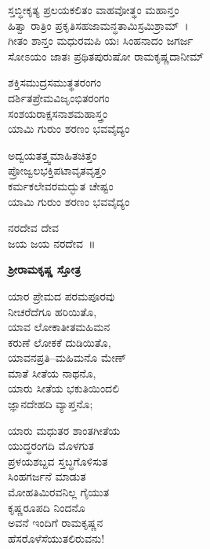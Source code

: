 
\begin{myquote}
ಸ್ತಬ್ಧೀಕೃತ್ಯ ಪ್ರಲಯಕಲಿತಂ ವಾಹವೋತ್ಥಂ ಮಹಾನ್ತಂ\\ಹಿತ್ವಾ ರಾತ್ರಿಂ ಪ್ರಕೃತಿಸಹಜಾಮನ್ಧತಾಮಿಸ್ರಮಿಶ್ರಾಮ್~।\\
ಗೀತಂ ಶಾನ್ತಂ ಮಧುರಮಪಿ ಯಃ ಸಿಂಹನಾದಂ ಜಗರ್ಜ\\ಸೋಽಯಂ ಜಾತಃ ಪ್ರಥಿತಪುರುಷೋ ರಾಮಕೃಷ್ಣದಾನೀಮ್
\end{myquote}


\begin{myquote}
ಶಕ್ತಿಸಮುದ್ರಸಮುತ್ಥತರಂಗಂ\\ದರ್ಶಿತಪ್ರೇಮವಿಜೃಂಭಿತರಂಗಂ\\ಸಂಶಯರಾಕ್ಷಸನಾಶಮಹಾಸ್ತ್ರಂ\\ಯಾಮಿ ಗುರುಂ ಶರಣಂ ಭವವೈದ್ಯಂ
\end{myquote}


\begin{myquote}
ಅದ್ವಯತತ್ತ್ವಮಾಹಿತಚಿತ್ತಂ\\ಪ್ರೋಜ್ವಲಭಕ್ತಿಪಟಾವೃತವೃತ್ತಂ\\ಕರ್ಮಕಲೇವರಮದ್ಭುತ ಚೇಷ್ಟಂ\\ಯಾಮಿ ಗುರುಂ ಶರಣಂ ಭವವೈದ್ಯಂ
\end{myquote}


\begin{myquote}
ನರದೇವ ದೇವ\\ಜಯ ಜಯ ನರದೇವ~॥
\end{myquote}

\begin{center}
\textbf{ಶ‍್ರೀರಾಮಕೃಷ್ಣ ಸ್ತೋತ್ರ}
\end{center}

\begin{myquote}
ಯಾರ ಪ್ರೇಮದ ಪರಮಪೂರವು\\ನೀಚರೆದೆಗೂ ಹರಿಯಿತೊ,\\ಯಾವ ಲೋಕಾತೀತಮಹಿಮನ\\ಕರುಣೆ ಲೋಕಕೆ ದುಡಿಯಿತೊ,\\ಯಾವನಪ್ರತಿ–ಮಹಿಮನೊ ಮೇಣ್\\ಮಾತೆ ಸೀತೆಯ ನಾಥನೊ,\\ಯಾರು ಸೀತೆಯ ಭಕುತಿಯಿಂದಲಿ\\ಜ್ಞಾನದೇಹದಿ ವ್ಯಾಪ್ತನೊ;
\end{myquote}

\begin{myquote}
ಯಾರು ಮಧುತರ ಶಾಂತಗೀತೆಯ\\ಯುದ್ಧರಂಗದಿ ಮೊಳಗುತ\\ಪ್ರಳಯಶಬ್ದವ ಸ್ತಬ್ಧಗೊಳಿಸುತ\\ಸಿಂಹಗರ್ಜನೆ ಮಾಡುತ\\ಮೋಹತಿಮಿರವನಿಲ್ಲ ಗೈಯುತ\\ಕೃಷ್ಣರೂಪದಿ ನಿಂದನೊ\\ಅವನೆ ಇಂದಿಗೆ ರಾಮಕೃಷ್ಣನ\\ಹೆಸರೊಳೆಸೆಯುತಲಿರುವನು!
\end{myquote}

